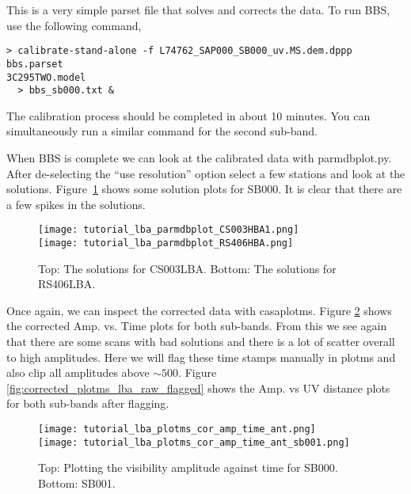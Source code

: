 This is a very simple parset file that solves and corrects the data. To run BBS, use the following command,


\begin{verbatim}
> calibrate-stand-alone -f L74762_SAP000_SB000_uv.MS.dem.dppp bbs.parset 
3C295TWO.model 
  > bbs_sb000.txt &
\end{verbatim}

The calibration process should be completed in about 10 minutes. You can simultaneously run a similar command for the second sub-band. 

When BBS is complete we can look at the calibrated data with  parmdbplot.py. After de-selecting the ``use resolution'' option select a few stations and look at the solutions. Figure~\ref{fig:parmdbplot_lba} shows some solution plots for SB000. It is clear that there are a few spikes in the solutions.


\begin{figure}[htp]
 \centering
\texttt{[image: tutorial\_lba\_parmdbplot\_CS003HBA1.png]}\\ 
\texttt{[image: tutorial\_lba\_parmdbplot\_RS406HBA.png]}
\caption{Top: The solutions for CS003LBA. Bottom: The solutions for RS406LBA.}
\label{fig:parmdbplot_lba}
\end{figure}

Once again, we can inspect the corrected data with casaplotms. Figure \ref{fig:corrected_plotms_lba_raw} shows the corrected Amp. vs. Time plots for both sub-bands. From this we see again that there are some scans with bad solutions and there is  a lot of scatter overall to high amplitudes. Here we will flag these time stamps manually in plotms and also clip all amplitudes above $\sim500$.  Figure \ref{fig:corrected_plotms_lba_raw_flagged} shows the Amp. vs UV distance plots for both sub-bands after flagging.

\begin{figure}[htp]
 \centering
\texttt{[image: tutorial\_lba\_plotms\_cor\_amp\_time\_ant.png]}\\
\texttt{[image: tutorial\_lba\_plotms\_cor\_amp\_time\_ant\_sb001.png]}\\
\caption{Top: Plotting the visibility amplitude against time for SB000. Bottom: SB001.}
\label{fig:corrected_plotms_lba_raw}
\end{figure}


